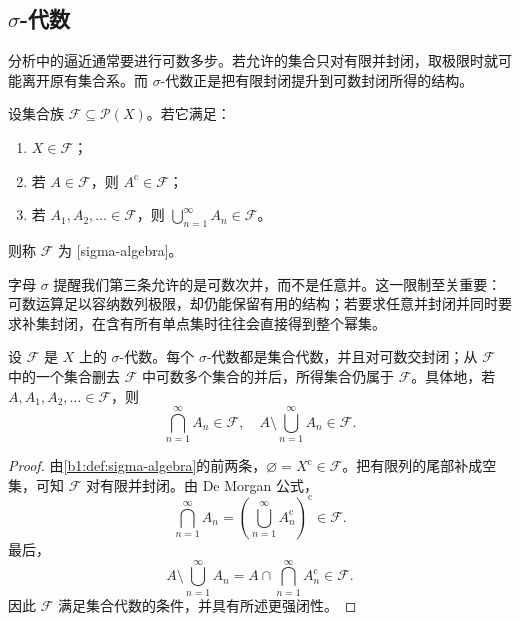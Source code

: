 \subsection{\texorpdfstring{\(\sigma\)}{\AnalysisPdfSigma}-代数}
\label{b1:subsec:010103}

分析中的逼近通常要进行可数多步。若允许的集合只对有限并封闭，取极限时就可能离开原有集合系。而 \(\sigma\)-代数正是把有限封闭提升到可数封闭所得的结构。

\begin{definition}
\label{b1:def:sigma-algebra}
设集合族 \(\mathcal F\subseteq\mathcal P(X)\)。若它满足：
\begin{enumerate}
  \item \label{b1:item:sigma-algebra-1}
  \(X\in\mathcal F\)；
  \item \label{b1:item:sigma-algebra-2}
  若 \(A\in\mathcal F\)，则 \(A^{\mathrm c}\in\mathcal F\)；
  \item \label{b1:item:sigma-algebra-3}
  若 \(A_1,A_2,\ldots\in\mathcal F\)，则 \(\bigcup_{n=1}^{\infty}A_n\in\mathcal F\)。
\end{enumerate}
则称 \(\mathcal F\) 为 [sigma-algebra]。
\end{definition}

字母 \(\sigma\) 提醒我们第三条允许的是可数次并，而不是任意并。这一限制至关重要：可数运算足以容纳数列极限，却仍能保留有用的结构；若要求任意并封闭并同时要求补集封闭，在含有所有单点集时往往会直接得到整个幂集。

\begin{proposition}
\label{b1:prop:sigma-closure}
设 \(\mathcal F\) 是 \(X\) 上的 \(\sigma\)-代数。每个 \(\sigma\)-代数都是集合代数，并且对可数交封闭；从 \(\mathcal F\) 中的一个集合删去 \(\mathcal F\) 中可数多个集合的并后，所得集合仍属于 \(\mathcal F\)。具体地，若 \(A,A_1,A_2,\ldots\in\mathcal F\)，则
\[
\bigcap_{n=1}^{\infty}A_n\in\mathcal F,
\quad
A\setminus\bigcup_{n=1}^{\infty}A_n\in\mathcal F.
\]
\end{proposition}
\begin{proof}
由\cref{b1:def:sigma-algebra}的前两条，\(\varnothing=X^{\mathrm c}\in\mathcal F\)。把有限列的尾部补成空集，可知 \(\mathcal F\) 对有限并封闭。由 De Morgan 公式，
\[
\bigcap_{n=1}^{\infty}A_n
=\left(\bigcup_{n=1}^{\infty}A_n^{\mathrm c}\right)^{\mathrm c}\in\mathcal F.
\]
最后，
\[
A\setminus\bigcup_{n=1}^{\infty}A_n
=A\cap\bigcap_{n=1}^{\infty}A_n^{\mathrm c}\in\mathcal F.
\]
因此 \(\mathcal F\) 满足集合代数的条件，并具有所述更强闭性。
\end{proof}

